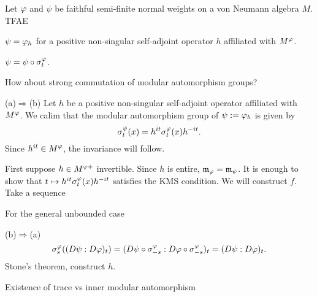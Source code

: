 \documentclass{../../../small}
\begin{document}
\begin{prop}
Let $\varphi$ and $\psi$ be faithful semi-finite normal weights on a von Neumann algebra $M$.
TFAE
\begin{parts}
\item $\psi=\varphi_h$ for a positive non-singular self-adjoint operator $h$ affiliated with $M^\varphi$.
\item $\psi=\psi\circ\sigma_t^\varphi$.
\end{parts}
How about strong commutation of modular automorphism groups?
\end{prop}
\begin{pf}
(a)$\Rightarrow$(b)
Let $h$ be a positive non-singular self-adjoint operator affiliated with $M^\varphi$.
We calim that the modular automorphism group of $\psi:=\varphi_h$ is given by
\[\sigma_t^{\psi}(x)=h^{it}\sigma_t^\varphi(x)h^{-it}.\]
Since $h^{it}\in M^\varphi$, the invariance will follow.

First suppose $h\in M^{\varphi+}$ invertible.
Since $h$ is entire, $\mathfrak{m}_\varphi=\mathfrak{m}_\psi$.
It is enough to show that $t\mapsto h^{it}\sigma_t^\varphi(x)h^{-it}$ satisfies the KMS condition.
We will construct $f$.
Take a sequence 

For the general unbounded case


(b)$\Rightarrow$(a)
\[\sigma_s^\varphi((D\psi:D\varphi)_t)=(D\psi\circ\sigma_{-s}^\varphi:D\varphi\circ\sigma_{-s}^\varphi)_t=(D\psi:D\varphi)_t.\]
Stone's theorem, construct $h$.

\end{pf}

\begin{prop}
\end{prop}


\begin{thm}
Existence of trace vs inner modular automorphism
\end{thm}
\begin{pf}

\end{pf}



\iffalse
\end{document}
